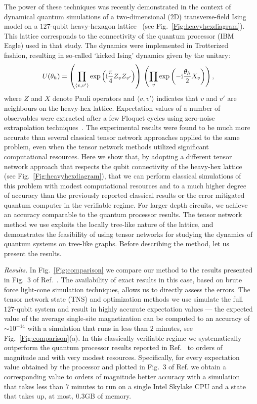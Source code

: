 \documentclass[%
 superscriptaddress,
 amsmath,amssymb,
 prx,
]{revtex4-2}
\begin{document}
The power of these techniques was recently demonstrated in the context of dynamical quantum simulations of a two-dimensional (2D) transverse-field Ising model on a $127$-qubit heavy-hexagon lattice~\cite{kim2023} (see Fig.~\ref{Fig:heavyhexdiagram}). This lattice corresponds to the connectivity of the quantum processor (IBM Eagle) used in that study. The dynamics were implemented in Trotterized fashion, resulting in so-called `kicked Ising' dynamics given by the unitary: 
\begin{equation}
    U(\theta_{h}) = \left(\prod_{\langle v,v' \rangle}\exp \left({\rm i} \frac{\pi}{4}Z_{v}Z_{v'} \right)\right)\,\left(\prod_{v}\exp \left(-{\rm i} \frac{\theta_{h}}{2}X_{v}\right)\right),
    \label{Eq:Propagator}
\end{equation}
where $Z$ and $X$ denote Pauli operators and $\langle v,v' \rangle$ indicates that $v$ and $v'$ are neighbours on the heavy-hex lattice. Expectation values of a number of observables were extracted after a few Floquet cycles using zero-noise extrapolation techniques~\cite{temme17}. 
The experimental results were found to be much more accurate than several classical tensor network approaches
applied to the same problem, even when the tensor network methods utilized significant computational resources. Here we show that, by adopting a different tensor network approach that respects the qubit connectivity of the heavy-hex lattice  (see Fig.~\ref{Fig:heavyhexdiagram}), that we can perform classical simulations of this problem with modest computational resources and to a much higher degree of accuracy than the previously reported classical results or the error mitigated quantum computer in the verifiable regime. For larger depth circuits, we achieve an accuracy comparable to the quantum processor results. The tensor network method we use exploits the locally tree-like nature of the lattice, and demonstrates the feasibility of using tensor networks for studying the dynamics of quantum systems on tree-like graphs. Before describing the method, let us present the results.
\par \emph{Results.} In Fig.~\ref{Fig:comparison} we compare our method to the results presented in Fig.~3 of Ref.~\cite{kim2023}. The availability of exact results in this case, based on brute force light-cone simulation techniques, allows us to directly assess the errors. The tensor network state (TNS) and optimization methods we use simulate the full $127$-qubit system and result in highly accurate expectation values --- the expected value of the average single-site magnetization can be computed to an accuracy of $\sim 10^{-14}$ with a simulation that runs in less than $2$ minutes, see Fig.~\ref{Fig:comparison}(a). In this classically verifiable regime we systematically outperform the quantum processor results reported in Ref.~\cite{kim2023} to orders of magnitude and with very modest resources. Specifically, for every expectation value obtained by the processor and plotted in Fig.~3 of Ref. \cite{kim2023} we obtain a corresponding value to orders of magnitude better accuracy with a simulation that takes less than $7$ minutes to run on a single Intel Skylake CPU and a state that takes up, at most, $0.3$GB of memory. 
\end{document}
